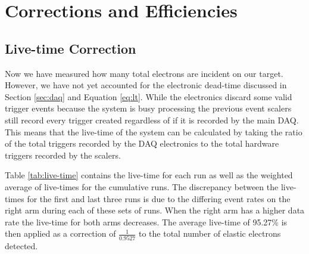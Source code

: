 \section{Corrections and Efficiencies}
\label{sec:cor_eff}

\subsection{Live-time Correction}
\label{ssec:live-time}

Now we have measured how many total electrons are incident on our target. However, we have not yet accounted for the electronic dead-time discussed in Section \ref{sec:daq} and Equation \ref{eq:lt}. While the electronics discard some valid trigger events because the system is busy processing the previous event scalers still record every trigger created regardless of if it is recorded by the main DAQ. This means that the live-time of the system can be calculated by taking the ratio of the total triggers recorded by the DAQ electronics to the total hardware triggers recorded by the scalers. 

Table \ref{tab:live-time} contains the live-time for each run as well as the weighted average of live-times for the cumulative runs. The discrepancy between the live-times for the first and last three runs is due to the differing event rates on the right arm during each of these sets of runs. When the right arm has a higher data rate the live-time for both arms decreases. The average live-time of 95.27$\%$ is then applied as a correction of $\frac{1}{0.9527}$ to the total number of elastic electrons detected.

\vspace{5mm}

